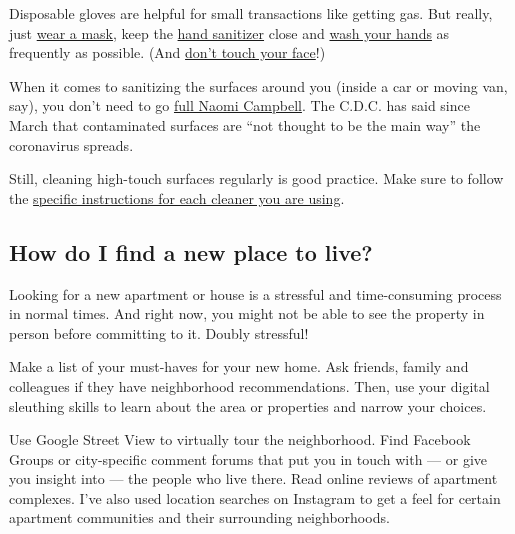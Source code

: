 Disposable gloves are helpful for small transactions like getting gas.
But really, just
\href{https://www.nytimes.com/article/coronavirus-facts-history.html\#link-6ec3dc3a}{wear
a mask}, keep the
\href{https://www.cdc.gov/coronavirus/2019-ncov/prevent-getting-sick/prevention.html?CDC_AA_refVal=https\%3A\%2F\%2Fwww.cdc.gov\%2Fcoronavirus\%2F2019-ncov\%2Fprepare\%2Fprevention.html}{hand
sanitizer} close and
\href{https://www.nytimes.com/2020/03/13/world/how-to-wash-your-hands-coronavirus.html}{wash
your hands} as frequently as possible. (And
\href{https://www.nytimes.com/2020/03/05/health/stop-touching-your-face-coronavirus.html}{don't
touch your face}!)

When it comes to sanitizing the surfaces around you (inside a car or
moving van, say), you don't need to go
\href{https://www.nytimes.com/2020/06/22/style/11-things-about-naomi-campbell.html}{full
Naomi Campbell}. The C.D.C. has said since March that contaminated
surfaces are ``not thought to be the main way'' the coronavirus spreads.

Still, cleaning high-touch surfaces regularly is good practice. Make
sure to follow the
\href{https://www.nytimes.com/2020/05/06/well/live/coronavirus-cleaning-cleaners-disinfectants-home.html}{specific
instructions for each cleaner you are using}.

\hypertarget{how-do-i-find-a-new-place-to-live}{%
\subsection{How do I find a new place to
live?}\label{how-do-i-find-a-new-place-to-live}}

Looking for a new apartment or house is a stressful and time-consuming
process in normal times. And right now, you might not be able to see the
property in person before committing to it. Doubly stressful!

Make a list of your must-haves for your new home. Ask friends, family
and colleagues if they have neighborhood recommendations. Then, use your
digital sleuthing skills to learn about the area or properties and
narrow your choices.

Use Google Street View to virtually tour the neighborhood. Find Facebook
Groups or city-specific comment forums that put you in touch with --- or
give you insight into --- the people who live there. Read online reviews
of apartment complexes. I've also used location searches on Instagram to
get a feel for certain apartment communities and their surrounding
neighborhoods.

